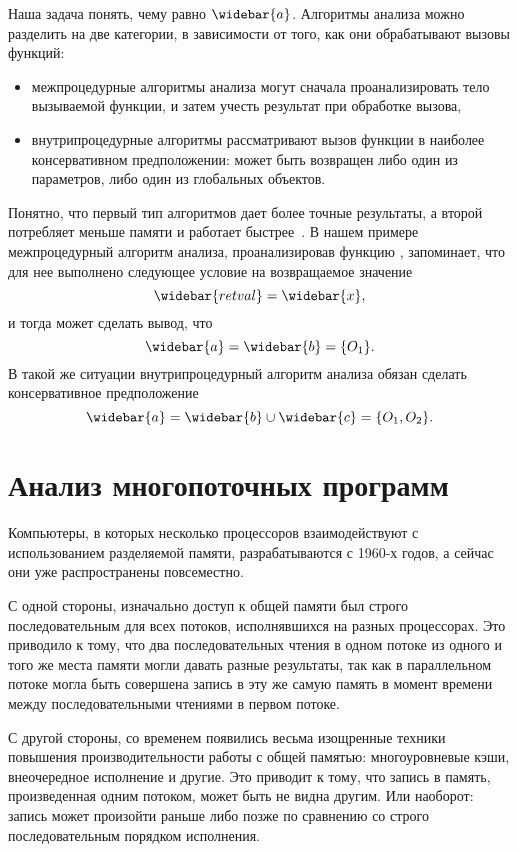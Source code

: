 \documentclass[14pt,titlepage,draft]{extarticle}
\newcommand{\pts}[1]{\widebar{#1}}
\begin{document}
        Наша задача понять, чему равно $\pts{a}$.
        Алгоритмы анализа можно разделить на две категории, в зависимости от
        того, как они обрабатывают вызовы функций:
        \begin{itemize}
          \item межпроцедурные алгоритмы анализа могут сначала проанализировать
                тело вызываемой функции, и затем учесть результат при обработке
                вызова,
          \item внутрипроцедурные алгоритмы рассматривают вызов функции в
                наиболее консервативном предположении: может быть возвращен
                либо один из параметров, либо один из глобальных объектов.
        \end{itemize}
        Понятно, что первый тип алгоритмов дает более точные результаты,
        а второй потребляет меньше памяти и работает
        быстрее~\cite[с.~117]{andersen}.
        В нашем примере межпроцедурный алгоритм анализа, проанализировав
        функцию , запоминает, что для нее выполнено следующее условие
        на возвращаемое значение
        \[\pts{retval} = \pts{x},\]
        и тогда может сделать вывод, что \[\pts{a} = \pts{b} = \{O_1\}.\]
        В такой же ситуации внутрипроцедурный алгоритм анализа обязан сделать
        консервативное предположение
        \[\pts{a} = \pts{b} \cup \pts{c} = \{O_1, O_2\}.\]

  \section{Анализ многопоточных программ}
    \label{section:intro_to_multithreading}

    Компьютеры, в которых несколько процессоров взаимодействуют с
    использованием разделяемой памяти, разрабатываются с 1960-х годов, а
    сейчас они уже распространены повсеместно.

    С одной стороны, изначально доступ к общей памяти был строго
    последовательным для всех потоков, исполнявшихся на разных процессорах.
    Это приводило к тому, что два последовательных чтения в одном потоке из
    одного и того же места памяти могли давать разные результаты, так как в
    параллельном потоке могла быть совершена запись в эту же самую память в
    момент времени между последовательными чтениями в первом потоке.

    С другой стороны, со временем появились весьма изощренные техники
    повышения производительности работы с общей памятью: многоуровневые кэши,
    внеочередное исполнение  и другие.
    Это приводит к тому, что запись в память, произведенная одним потоком,
    может быть не видна другим. Или наоборот: запись может произойти раньше
    либо позже по сравнению со строго последовательным порядком исполнения.
\end{document}
